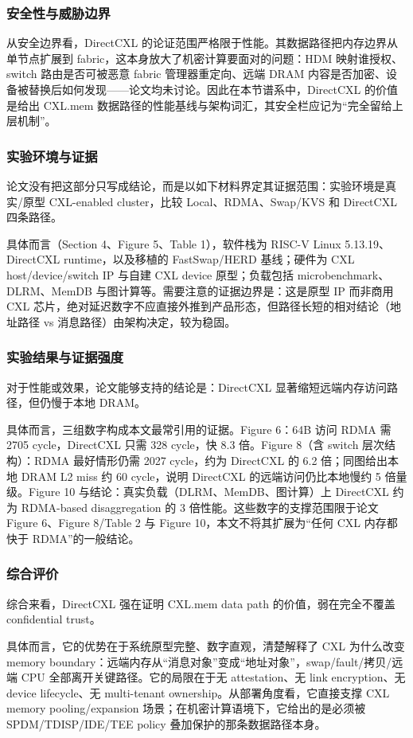 \documentclass[11pt]{ctexart}
\begin{document}
\subsubsection{安全性与威胁边界}
从安全边界看，DirectCXL 的论证范围严格限于性能。其数据路径把内存边界从单节点扩展到 fabric，这本身放大了机密计算要面对的问题：HDM 映射谁授权、switch 路由是否可被恶意 fabric 管理器重定向、远端 DRAM 内容是否加密、设备被替换后如何发现——论文均未讨论。因此在本节谱系中，DirectCXL 的价值是给出 CXL.mem 数据路径的性能基线与架构词汇，其安全栏应记为“完全留给上层机制”。\par
\subsubsection{实验环境与证据}
论文没有把这部分只写成结论，而是以如下材料界定其证据范围：实验环境是真实/原型 CXL-enabled cluster，比较 Local、RDMA、Swap/KVS 和 DirectCXL 四条路径。\par
具体而言（Section 4、Figure 5、Table 1），软件栈为 RISC-V Linux 5.13.19、DirectCXL runtime，以及移植的 FastSwap/HERD 基线；硬件为 CXL host/device/switch IP 与自建 CXL device 原型；负载包括 microbenchmark、DLRM、MemDB 与图计算等。需要注意的证据边界是：这是原型 IP 而非商用 CXL 芯片，绝对延迟数字不应直接外推到产品形态，但路径长短的相对结论（地址路径 vs 消息路径）由架构决定，较为稳固。\par
\subsubsection{实验结果与证据强度}
对于性能或效果，论文能够支持的结论是：DirectCXL 显著缩短远端内存访问路径，但仍慢于本地 DRAM。\par
具体而言，三组数字构成本文最常引用的证据。Figure 6：64B 访问 RDMA 需 2705 cycle，DirectCXL 只需 328 cycle，快 8.3 倍。Figure 8（含 switch 层次结构）：RDMA 最好情形仍需 2027 cycle，约为 DirectCXL 的 6.2 倍；同图给出本地 DRAM L2 miss 约 60 cycle，说明 DirectCXL 的远端访问仍比本地慢约 5 倍量级。Figure 10 与结论：真实负载（DLRM、MemDB、图计算）上 DirectCXL 约为 RDMA-based disaggregation 的 3 倍性能。这些数字的支撑范围限于论文 Figure 6、Figure 8/Table 2 与 Figure 10，本文不将其扩展为“任何 CXL 内存都快于 RDMA”的一般结论。\par
\subsubsection{综合评价}
综合来看，DirectCXL 强在证明 CXL.mem data path 的价值，弱在完全不覆盖 confidential trust。\par
具体而言，它的优势在于系统原型完整、数字直观，清楚解释了 CXL 为什么改变 memory boundary：远端内存从“消息对象”变成“地址对象”，swap/fault/拷贝/远端 CPU 全部离开关键路径。它的局限在于无 attestation、无 link encryption、无 device lifecycle、无 multi-tenant ownership。从部署角度看，它直接支撑 CXL memory pooling/expansion 场景；在机密计算语境下，它给出的是必须被 SPDM/TDISP/IDE/TEE policy 叠加保护的那条数据路径本身。\par
\end{document}
